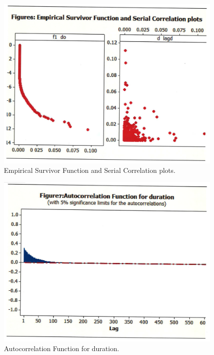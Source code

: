  	\begin{figure}[!ht]
	\centering	
	\includegraphics[width=\textwidth]{chapters/chapter_uvts/figures/Sec2-10Fig6.png}
	\caption{Empirical Survivor Function and Serial Correlation plots. \label{fig:survivor}}
	\end{figure}
	
	\begin{figure}[!ht]
	\centering
	 \includegraphics[width=\textwidth]{chapters/chapter_uvts/figures/Sec2-10Fig7.png}
	\caption{Autocorrelation Function for duration. \label{fig:duration}}
	\end{figure}
 
